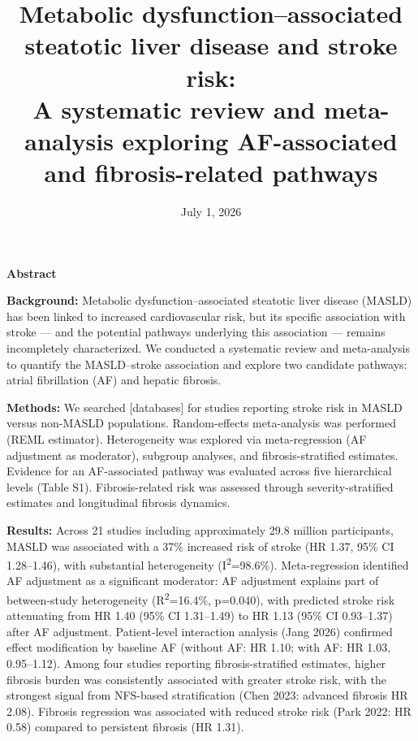 \documentclass[12pt,a4paper]{article}
\title{\textbf{Metabolic dysfunction--associated steatotic liver disease and stroke risk:\\
A systematic review and meta-analysis exploring AF-associated and fibrosis-related pathways}}
\author{
}
\date{July 1, 2026}
\begin{document}
\maketitle

\begin{center}
\textbf{Abstract}
\end{center}
\vspace{-8pt}

\textbf{Background:} Metabolic dysfunction--associated steatotic liver disease (MASLD) has been linked to increased cardiovascular risk, but its specific association with stroke — and the potential pathways underlying this association — remains incompletely characterized. We conducted a systematic review and meta-analysis to quantify the MASLD--stroke association and explore two candidate pathways: atrial fibrillation (AF) and hepatic fibrosis.

\textbf{Methods:} We searched [databases] for studies reporting stroke risk in MASLD versus non-MASLD populations. Random-effects meta-analysis was performed (REML estimator). Heterogeneity was explored via meta-regression (AF adjustment as moderator), subgroup analyses, and fibrosis-stratified estimates. Evidence for an AF-associated pathway was evaluated across five hierarchical levels (Table S1). Fibrosis-related risk was assessed through severity-stratified estimates and longitudinal fibrosis dynamics.

\textbf{Results:} Across 21 studies including approximately 29.8 million participants, MASLD was associated with a 37\% increased risk of stroke (HR 1.37, 95\% CI 1.28--1.46), with substantial heterogeneity (I\textsuperscript{2}=98.6\%). Meta-regression identified AF adjustment as a significant moderator: AF adjustment explains part of between-study heterogeneity (R\textsuperscript{2}=16.4\%, p=0.040), with predicted stroke risk attenuating from HR 1.40 (95\% CI 1.31--1.49) to HR 1.13 (95\% CI 0.93--1.37) after AF adjustment. Patient-level interaction analysis (Jang 2026) confirmed effect modification by baseline AF (without AF: HR 1.10; with AF: HR 1.03, 0.95--1.12). Among four studies reporting fibrosis-stratified estimates, higher fibrosis burden was consistently associated with greater stroke risk, with the strongest signal from NFS-based stratification (Chen 2023: advanced fibrosis HR 2.08). Fibrosis regression was associated with reduced stroke risk (Park 2022: HR 0.58) compared to persistent fibrosis (HR 1.31).
\end{document}
